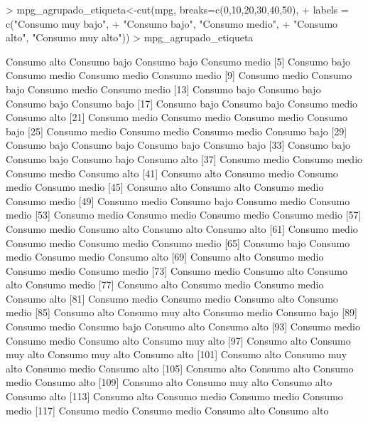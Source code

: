 \documentclass [a4paper] {article}
\begin{document}
\begin{Schunk}
\begin{Sinput}
> mpg_agrupado_etiqueta<-cut(mpg, breaks=c(0,10,20,30,40,50),
+  labels = c("Consumo muy bajo", 
+ "Consumo bajo", "Consumo medio", 
+ "Consumo alto", "Consumo muy alto"))
> mpg_agrupado_etiqueta
\end{Sinput}
\begin{Soutput}
  [1] Consumo alto     Consumo bajo     Consumo bajo     Consumo medio   
  [5] Consumo bajo     Consumo medio    Consumo medio    Consumo medio   
  [9] Consumo medio    Consumo bajo     Consumo medio    Consumo medio   
 [13] Consumo bajo     Consumo bajo     Consumo bajo     Consumo bajo    
 [17] Consumo bajo     Consumo bajo     Consumo medio    Consumo alto    
 [21] Consumo medio    Consumo medio    Consumo medio    Consumo bajo    
 [25] Consumo medio    Consumo medio    Consumo medio    Consumo bajo    
 [29] Consumo bajo     Consumo bajo     Consumo bajo     Consumo bajo    
 [33] Consumo bajo     Consumo bajo     Consumo bajo     Consumo alto    
 [37] Consumo medio    Consumo medio    Consumo medio    Consumo alto    
 [41] Consumo alto     Consumo medio    Consumo medio    Consumo medio   
 [45] Consumo alto     Consumo alto     Consumo medio    Consumo medio   
 [49] Consumo medio    Consumo bajo     Consumo medio    Consumo medio   
 [53] Consumo medio    Consumo medio    Consumo medio    Consumo medio   
 [57] Consumo medio    Consumo alto     Consumo alto     Consumo alto    
 [61] Consumo medio    Consumo medio    Consumo medio    Consumo medio   
 [65] Consumo bajo     Consumo medio    Consumo medio    Consumo alto    
 [69] Consumo alto     Consumo medio    Consumo medio    Consumo medio   
 [73] Consumo medio    Consumo alto     Consumo alto     Consumo medio   
 [77] Consumo alto     Consumo medio    Consumo medio    Consumo alto    
 [81] Consumo medio    Consumo medio    Consumo alto     Consumo medio   
 [85] Consumo alto     Consumo muy alto Consumo medio    Consumo bajo    
 [89] Consumo medio    Consumo bajo     Consumo alto     Consumo alto    
 [93] Consumo medio    Consumo medio    Consumo alto     Consumo muy alto
 [97] Consumo alto     Consumo muy alto Consumo muy alto Consumo alto    
[101] Consumo alto     Consumo muy alto Consumo medio    Consumo alto    
[105] Consumo alto     Consumo alto     Consumo medio    Consumo alto    
[109] Consumo alto     Consumo muy alto Consumo alto     Consumo alto    
[113] Consumo alto     Consumo medio    Consumo medio    Consumo medio   
[117] Consumo medio    Consumo medio    Consumo alto     Consumo alto    

\end{Soutput}
\end{Schunk}
\end{document}
